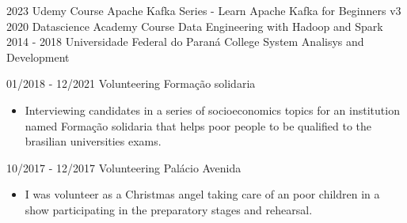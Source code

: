 \documentclass[9pt]{developercv} %
\begin{document}
\vspace{-10 pt}
\begin{entrylist}
	\entry
		{2023}
		{Udemy}
		{Course}
		{Apache Kafka Series - Learn Apache Kafka for Beginners v3}
    \entry
		{2020}
		{Datascience Academy}
		{Course}
		{Data Engineering with Hadoop and Spark}
    \entry
		{2014 - 2018}
		{Universidade Federal do Paraná}
		{College}
		{System Analisys and Development}
\end{entrylist}
\vspace{-10 pt}
\begin{entrylist}
	\entry
        {01/2018 - 12/2021}
		{Volunteering}
		{Formação solidaria}
		{\vspace{-10pt}
        \begin{itemize}[noitemsep,topsep=0pt,parsep=0pt,partopsep=0pt, leftmargin=-1pt]
            \item Interviewing candidates in a series of socioeconomics topics for an institution named Formação solidaria that helps poor people to be qualified to the brasilian universities exams.
        \end{itemize} }
	\entry
		{10/2017 - 12/2017}
		{Volunteering}
		{Palácio Avenida}
		{\vspace{-10pt}
        \begin{itemize}[noitemsep,topsep=0pt,parsep=0pt,partopsep=0pt, leftmargin=-1pt]
            \item I was volunteer as a Christmas angel taking care of an poor children in a show participating in the preparatory stages and rehearsal. 
        \end{itemize} }
\end{entrylist}
\end{document}

